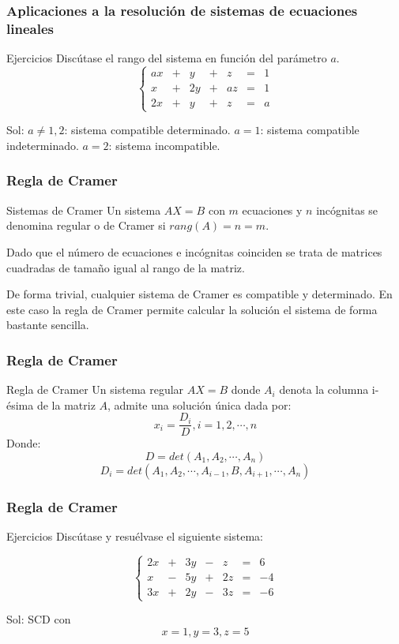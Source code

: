 \documentclass[12pt]{article}
\begin{document}
         \begin{frame}
  \frametitle{Aplicaciones a la resoluci\'on de sistemas de ecuaciones lineales}
     \begin{block}{Ejercicios}
Disc\'utase el rango del sistema en funci\'on del par\'ametro $a$.
\[
\left\{\begin{array}{ccccccc}ax & + & y & + & z & = & 1 \\
x & + & 2y & +  & az  & = & 1 \\
2x & + & y & + & z & = & a\end{array}\right.
\]
\end{block}
Sol: $a\neq 1,2$: sistema compatible determinado.
$a=1$: sistema compatible indeterminado.
 $a=2$: sistema incompatible.
\end{frame} 


         \begin{frame}
  \frametitle{Regla de Cramer}
     \begin{block}{Sistemas de Cramer}
Un sistema $AX=B$ con $m$ ecuaciones y $n$ inc\'ognitas se denomina regular o de Cramer si $rang(A) = n = m$.
\end{block}
Dado que el n\'umero de ecuaciones e inc\'ognitas coinciden se trata de matrices cuadradas de tama\~no igual al rango de la matriz.


De forma trivial, cualquier sistema de Cramer es compatible y determinado. En este caso la regla de Cramer permite calcular la soluci\'on el sistema de forma bastante sencilla.

\end{frame} 



         \begin{frame}
  \frametitle{Regla de Cramer}
     \begin{block}{Regla de Cramer}
Un sistema regular $AX=B$ donde $A_i$ denota la columna i-\'esima de la matriz $A$, admite una soluci\'on \'unica dada por:
\[x_i = \frac{D_i}{D}, i = 1,2,\cdots,n\]
Donde: 
\[D=det(A_1,A_2,\cdots,A_n)\]
\[D_i=det(A_1,A_2,\cdots,A_{i-1},B,A_{i+1},\cdots,A_n)\]
\end{block}

\end{frame} 


         \begin{frame}
  \frametitle{Regla de Cramer}
     \begin{block}{Ejercicios}
Disc\'utase y resu\'elvase el siguiente sistema:

\[
\left\{\begin{array}{ccccccc}2x & + & 3y & - & z & = & 6 \\
x & - & 5y & +  & 2z  & = & -4 \\
3x & + & 2y & -& 3z & = & -6\end{array}\right.
\]
\end{block}
Sol: SCD con
\[x=1, y=3, z=5\]
\end{frame} 
\end{document}
